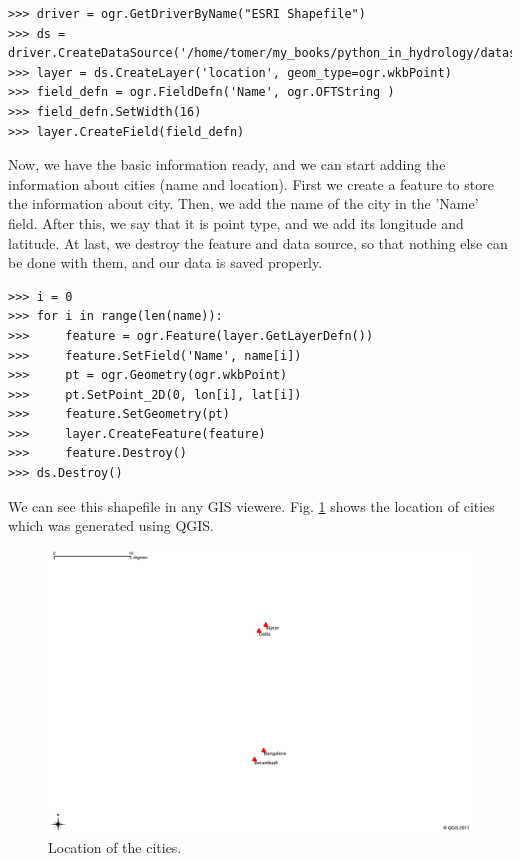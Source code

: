 \documentclass[10pt]{book}
\begin{document}
{\beforeverb \begin{verbatim}
>>> driver = ogr.GetDriverByName("ESRI Shapefile")
>>> ds = driver.CreateDataSource('/home/tomer/my_books/python_in_hydrology/datas/')
>>> layer = ds.CreateLayer('location', geom_type=ogr.wkbPoint)
>>> field_defn = ogr.FieldDefn('Name', ogr.OFTString )
>>> field_defn.SetWidth(16)
>>> layer.CreateField(field_defn)
\end{verbatim} \afterverb

Now, we have the basic information ready, and we can start adding the information about cities (name and location). First we create a feature to store the information about city. Then, we add the name of the city in the 'Name' field. After this, we say that it is point type, and we add its longitude and latitude. At last, we destroy the feature and data source, so that nothing else can be done with them, and our data is saved properly. 
\beforeverb \begin{verbatim}
>>> i = 0
>>> for i in range(len(name)):
>>>     feature = ogr.Feature(layer.GetLayerDefn())
>>>     feature.SetField('Name', name[i])
>>>     pt = ogr.Geometry(ogr.wkbPoint)
>>>     pt.SetPoint_2D(0, lon[i], lat[i])
>>>     feature.SetGeometry(pt)
>>>     layer.CreateFeature(feature)
>>>     feature.Destroy()
>>> ds.Destroy()
\end{verbatim} \afterverb

We can see this shapefile in any GIS viewere. Fig. \ref{fig:location} shows the location of cities which was generated using QGIS. 

\beforefig
\begin{figure}[h!]
  \centering
    \includegraphics[width=1.0\textwidth]{images/location.png}
  \caption{Location of the cities.}
   \label{fig:location}
\end{figure}
\afterfig

}
\end{document}
